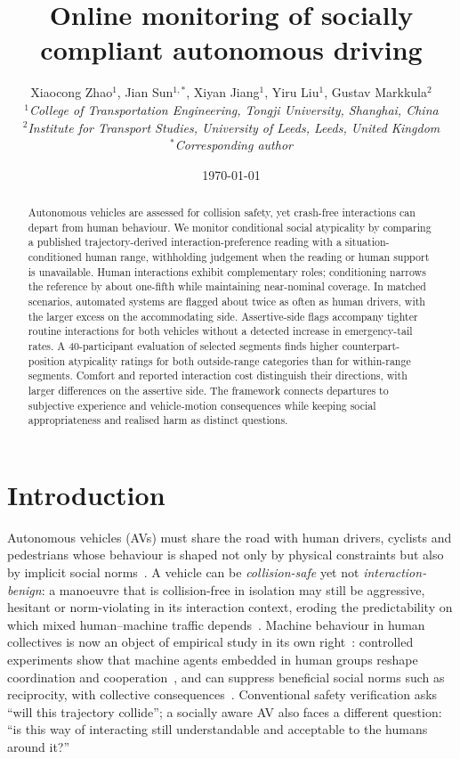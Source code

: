 \documentclass[12pt,a4paper]{article}
\title{Online monitoring of socially compliant autonomous driving}
\author{
    Xiaocong Zhao$^{1}$, Jian Sun$^{1,*}$, Xiyan Jiang$^{1}$, Yiru Liu$^{1}$,
    Gustav Markkula$^{2}$ \\[0.5em]
    \textit{$^{1}$College of Transportation Engineering, Tongji University, Shanghai, China} \\
    \textit{$^{2}$Institute for Transport Studies, University of Leeds, Leeds, United Kingdom} \\[0.4em]
    \textit{$^{*}$Corresponding author}
}
\date{\today}
\begin{document}
\maketitle

\begin{abstract}
\noindent
Autonomous vehicles are assessed for collision safety, yet crash-free interactions can depart from
human behaviour. We monitor conditional social atypicality by comparing a published trajectory-derived
interaction-preference reading with a situation-conditioned human range, withholding judgement when
the reading or human support is unavailable. Human interactions exhibit complementary roles;
conditioning narrows the reference by about one-fifth while maintaining near-nominal coverage. In
matched scenarios, automated systems are flagged about twice as often as human drivers, with the
larger excess on the accommodating side. Assertive-side flags accompany tighter routine interactions
for both vehicles without a detected increase in emergency-tail rates. A 40-participant evaluation
of selected segments finds higher counterpart-position atypicality ratings for both outside-range
categories than for within-range segments. Comfort and reported interaction cost distinguish their
directions, with larger differences on the assertive side. The framework connects departures to
subjective experience and vehicle-motion consequences while keeping social appropriateness and
realised harm as distinct questions.
\end{abstract}

\section{Introduction}
Autonomous vehicles (AVs) must share the road with human drivers, cyclists and pedestrians whose
behaviour is shaped not only by physical constraints but also by implicit social norms~\cite{markkula2020defining, rasouli2020autonomous, wang2022social}. A vehicle
can be \emph{collision-safe} yet not \emph{interaction-benign}: a manoeuvre that is collision-free
in isolation may still be aggressive, hesitant or norm-violating in its interaction context,
eroding the predictability on which mixed human--machine traffic depends~\cite{trautman2010unfreezing, favaro2017examining, petrovic2020traffic}. Machine behaviour in human collectives is now an object of empirical study in its own
right~\cite{rahwan2019machine}: controlled experiments show that machine agents embedded in
human groups reshape coordination and cooperation~\cite{shirado2017locally,
crandall2018cooperating, ishowo2019transparency}, and can suppress beneficial social norms such as
reciprocity, with collective consequences~\cite{shirado2023reciprocity}. Conventional safety
verification asks ``will this trajectory collide''; a socially aware AV also faces a different
question: ``is this way of interacting still understandable and acceptable to the humans around
it?''
\end{document}
